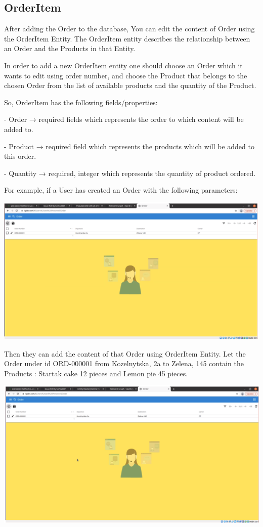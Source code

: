 \subsection{OrderItem}

After adding the Order to the database, You can edit the content of Order using the OrderItem Entity. The OrderItem entity describes the relationship between an Order and the Products in that Entity. 

In order to add a new OrderItem entity one should choose an Order which it wants to edit using order number, and choose the Product that belongs to the chosen Order from the list of available products and the quantity of the Product. 

So, OrderItem has the following fields/properties:


- Order →  required fields which represents the order to which content will be added to.

- Product →  required field which represents the products which will be added to this order.

- Quantity →  required, integer which represents the quantity of product ordered.


For example, if a User has created an Order with the following parameters:

\includegraphics[width=\textwidth]{sections/01-chapter/images/orderitem1.png}

Then they can add the content of that Order using OrderItem Entity. Let the Order under id ORD-000001 from Kozelnytska, 2a to Zelena, 145 contain the Products : Startak cake 12  pieces and Lemon pie 45 pieces. 

\includegraphics[width=\textwidth]{sections/01-chapter/images/orderitem2.png}

